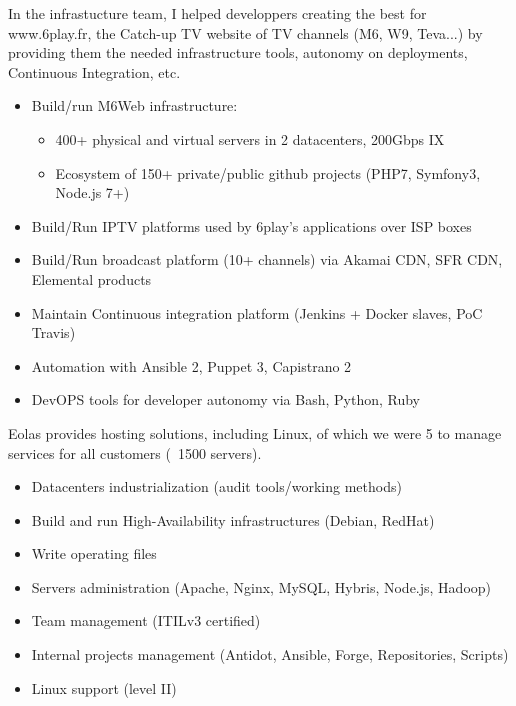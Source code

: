 \documentclass[12pt,a4paper,roman]{moderncv}          %
\begin{document}
{In the infrastucture team, I helped developpers creating the best for www.6play.fr, the Catch-up TV website of TV channels (M6, W9, Teva...) by providing them the needed infrastructure tools, autonomy on deployments, Continuous Integration, etc.
\begin{itemize}
  \item Build/run M6Web infrastructure:
  \begin{itemize}
    \item 400+ physical and virtual servers in 2 datacenters, 200Gbps IX
    \item Ecosystem of 150+ private/public github projects (PHP7, Symfony3, Node.js 7+)
  \end{itemize}
  \item Build/Run IPTV platforms used by 6play's applications over ISP boxes
  \item Build/Run broadcast platform (10+ channels) via Akamai CDN, SFR CDN, Elemental products
  \item Maintain Continuous integration platform (Jenkins + Docker slaves, PoC Travis)
  \item Automation with Ansible 2, Puppet 3, Capistrano 2
  \item DevOPS tools for developer autonomy via Bash, Python, Ruby
\end{itemize}}


{Eolas provides hosting solutions, including Linux, of which we were 5 to manage services for all customers (~1500 servers).
\begin{itemize}
  \item Datacenters industrialization (audit tools/working methods)
  \item Build and run High-Availability infrastructures (Debian, RedHat)
  \item Write operating files
  \item Servers administration (Apache, Nginx, MySQL, Hybris, Node.js, Hadoop)
  \item Team management (ITILv3 certified)
  \item Internal projects management (Antidot, Ansible, Forge, Repositories, Scripts)
  \item Linux support (level II)
\end{itemize}}
\end{document}
